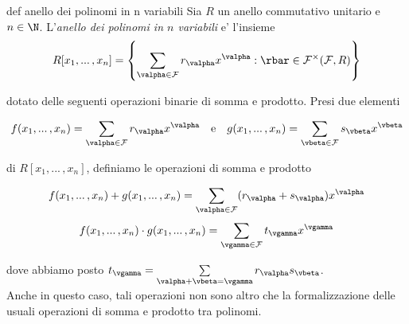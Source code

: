 \begin{defn}{def anello dei polinomi in n variabili}
  Sia $R$ un anello commutativo unitario e $n\in \N$. L'\emph{anello dei polinomi in $n$ variabili} e' l'insieme
  $$R[x_1,...\,,x_n]=\left\{ \sum\limits_{\valpha\in \mathcal{F}} r_{\valpha} x^{\valpha} : \rbar \in \mathcal{F}^{\times}(\mathcal{F},R) \right\}$$ 

  dotato delle seguenti operazioni binarie di somma e prodotto. Presi due elementi 

  $$f(x_1,...\,,x_n) = \sum\limits_{\valpha\in \mathcal{F}}r_{\valpha} x^{\valpha} \ 
  \ \text{ e } \ \ g(x_1,...\,,x_n)=\sum\limits_{\vbeta\in \mathcal{F}}s_{\vbeta} x^{\vbeta}$$ 

  di $R[x_1,...\,,x_n]$, definiamo le operazioni di somma e prodotto 

  $$f(x_1,...\,,x_n)+g(x_1,...\,,x_n)=\sum\limits_{\valpha\in \mathcal{F}}(r_{\valpha}+s_{\valpha}) x^{\valpha}$$ 
  $$f(x_1,...\,,x_n)\cdot g(x_1,...\,,x_n)=\sum\limits_{\vgamma \in \mathcal{F}}t_{\vgamma}x^{\vgamma}$$ 

  \noindent dove abbiamo posto $t_{\vgamma}=\sum\limits_{\valpha+\vbeta=\vgamma} r_{\valpha}s_{\vbeta}$.\\
  Anche in questo caso, tali operazioni non sono altro che la formalizzazione delle usuali operazioni di somma e prodotto tra polinomi. 
\end{defn}

